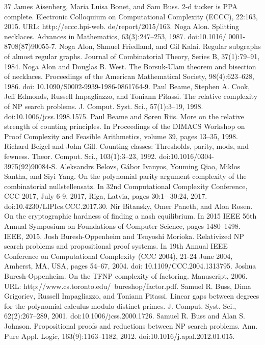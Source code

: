 \begin{thebibliography}{37}
 James Aisenberg, Maria Luisa Bonet, and Sam Buss. 2-d tucker is PPA complete. Electronic Colloquium on Computational Complexity (ECCC), 22:163, 2015. URL: http://eccc.hpi-web. de/report/2015/163.
 Noga Alon. Splitting necklaces. Advances in Mathematics, 63(3):247–253, 1987. doi:10.1016/ 0001-8708(87)90055-7.
 Noga Alon, Shmuel Friedland, and Gil Kalai. Regular subgraphs of almost regular graphs. Journal of Combinatorial Theory, Series B, 37(1):79–91, 1984.
 Noga Alon and Douglas B. West. The Borsuk-Ulam theorem and bisection of necklaces. Proceedings of the American Mathematical Society, 98(4):623–628, 1986. doi: 10.1090/S0002-9939-1986-0861764-9.
 Paul Beame, Stephen A. Cook, Jeff Edmonds, Russell Impagliazzo, and Toniann Pitassi. The relative complexity of NP search problems. J. Comput. Syst. Sci., 57(1):3–19, 1998. doi:10.1006/jcss.1998.1575.
 Paul Beame and Søren Riis. More on the relative strength of counting principles. In Proceedings of the DIMACS Workshop on Proof Complexity and Feasible Arithmetics, volume 39, pages 13–35, 1998.
 Richard Beigel and John Gill. Counting classes: Thresholds, parity, mods, and fewness. Theor. Comput. Sci., 103(1):3–23, 1992. doi:10.1016/0304-3975(92)90084-S.
 Aleksandrs Belovs, Gábor Ivanyos, Youming Qiao, Miklos Santha, and Siyi Yang. On the polynomial parity argument complexity of the combinatorial nullstellensatz. In 32nd Computational Complexity Conference, CCC 2017, July 6-9, 2017, Riga, Latvia, pages 30:1– 30:24, 2017. doi:10.4230/LIPIcs.CCC.2017.30.
 Nir Bitansky, Omer Paneth, and Alon Rosen. On the cryptographic hardness of finding a nash equilibrium. In 2015 IEEE 56th Annual Symposium on Foundations of Computer Science, pages 1480–1498. IEEE, 2015.
 Josh Buresh-Oppenheim and Tsuyoshi Morioka. Relativized NP search problems and propositional proof systems. In 19th Annual IEEE Conference on Computational Complexity (CCC 2004), 21-24 June 2004, Amherst, MA, USA, pages 54–67, 2004. doi: 10.1109/CCC.2004.1313795.
 Joshua Buresh-Oppenheim. On the TFNP complexity of factoring. Manuscript, 2006. URL: http://www.cs.toronto.edu/~bureshop/factor.pdf.
 Samuel R. Buss, Dima Grigoriev, Russell Impagliazzo, and Toniann Pitassi. Linear gaps between degrees for the polynomial calculus modulo distinct primes. J. Comput. Syst. Sci., 62(2):267–289, 2001. doi:10.1006/jcss.2000.1726.
 Samuel R. Buss and Alan S. Johnson. Propositional proofs and reductions between NP search problems. Ann. Pure Appl. Logic, 163(9):1163–1182, 2012. doi:10.1016/j.apal.2012.01.015.

\end{thebibliography}
